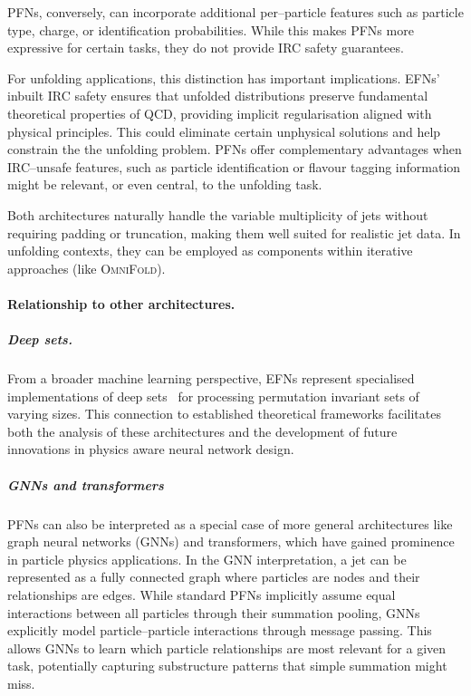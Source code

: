         PFNs, conversely, can incorporate additional per--particle features such as particle type, charge, or identification probabilities.
        While this makes PFNs more expressive for certain tasks, they do not provide IRC safety guarantees.
        
        For unfolding applications, this distinction has important implications.
        EFNs' inbuilt IRC safety ensures that unfolded distributions preserve fundamental theoretical properties of QCD, providing implicit regularisation aligned with physical principles.
        This could eliminate certain unphysical solutions and help constrain the the unfolding problem.
        PFNs offer complementary advantages when IRC--unsafe features, such as particle identification or flavour tagging information might be relevant, or even central, to the unfolding task.
        
        Both architectures naturally handle the variable multiplicity of jets without requiring padding or truncation, making them well suited for realistic jet data.
        In unfolding contexts, they can be employed as components within iterative approaches (like \textsc{OmniFold}).

        \paragraph{Relationship to other architectures.}
            \subparagraph{Deep sets.}
                From a broader machine learning perspective, EFNs represent specialised implementations of deep sets~\cite{Sauer2023MeasurementCollider} for processing permutation invariant sets of varying sizes.
                This connection to established theoretical frameworks facilitates both the analysis of these architectures and the development of future innovations in physics aware neural network design.
            \subparagraph{GNNs and transformers}
            \label{subpar:pfns-gnns-and-transformers}
                    PFNs can also be interpreted as a special case of more general architectures like graph neural networks (GNNs) and transformers, which have gained prominence in particle physics applications.
                    In the GNN interpretation, a jet can be represented as a fully connected graph where particles are nodes and their relationships are edges.
                    While standard PFNs implicitly assume equal interactions between all particles through their summation pooling, GNNs explicitly model particle--particle interactions through message passing.
                    This allows GNNs to learn which particle relationships are most relevant for a given task, potentially capturing substructure patterns that simple summation might miss.
                    
